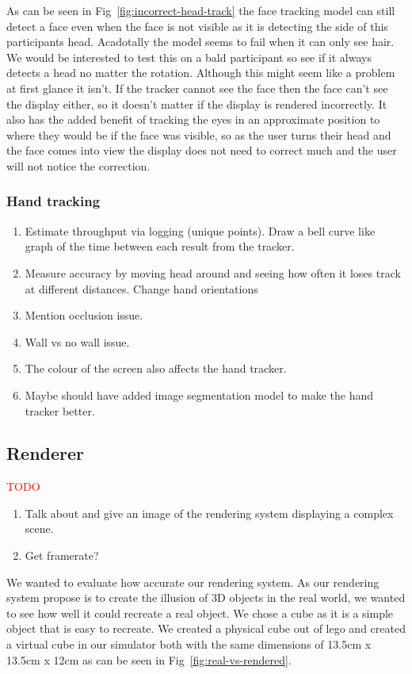 As can be seen in Fig~\ref{fig:incorrect-head-track} the face tracking model can still detect a face even when the face is not visible as it is detecting the side of this participants head. Acadotally the model seems to fail when it can only see hair. We would be interested to test this on a bald participant so see if it always detects a head no matter the rotation. Although this might seem like a problem at first glance it isn't. If the tracker cannot see the face then the face can't see the display either, so it doesn't matter if the display is rendered incorrectly. It also has the added benefit of tracking the eyes in an approximate position to where they would be if the face was visible, so as the user turns their head and the face comes into view the display does not need to correct much and the user will not notice the correction.

\subsubsection{Hand tracking}
\begin{enumerate}
	\item Estimate throughput via logging (unique points). Draw a bell curve like graph of the time between each result from the tracker.
	\item Measure accuracy by moving head around and seeing how often it loses track at different distances. Change hand orientations
	\item Mention occlusion issue. 
	\item Wall vs no wall issue. 
	\item The colour of the screen also affects the hand tracker. 
	\item Maybe should have added image segmentation model to make the hand tracker better.
\end{enumerate}

\subsection{Renderer}
\textcolor{red}{TODO}
\begin{enumerate}
	\item Talk about and give an image of the rendering system displaying a complex scene.
	\item Get framerate?
\end{enumerate}

We wanted to evaluate how accurate our rendering system. As our rendering system propose is to create the illusion of 3D objects in the real world, we wanted to see how well it could recreate a real object. We chose a cube as it is a simple object that is easy to recreate. We created a physical cube out of lego and created a virtual cube in our simulator both with the same dimensions of 13.5cm x 13.5cm x 12cm as can be seen in Fig~\ref{fig:real-vs-rendered}.


